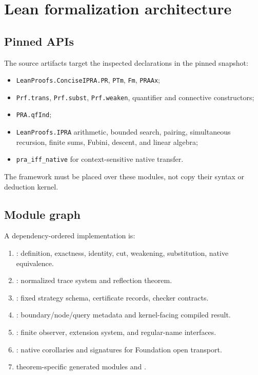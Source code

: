 \section{Lean formalization architecture}\label{sec:lean}

\subsection{Pinned APIs}

The source artifacts target the inspected declarations in the pinned snapshot:
\begin{itemize}
  \item \texttt{LeanProofs.ConciseIPRA.PR}, \texttt{PTm}, \texttt{Fm}, \texttt{PRAAx};
  \item \texttt{Prf.trans}, \texttt{Prf.subst}, \texttt{Prf.weaken}, quantifier and connective constructors;
  \item \texttt{PRA.qfInd};
  \item \texttt{LeanProofs.IPRA} arithmetic, bounded search, pairing, simultaneous recursion, finite sums, Fubini, descent, and linear algebra;
  \item \texttt{pra\_iff\_native} for context-sensitive native transfer.
\end{itemize}
The framework must be placed over these modules, not copy their syntax or deduction kernel.

\subsection{Module graph}

A dependency-ordered implementation is:
\begin{enumerate}[label=\textbf{M\arabic*.},leftmargin=4.2em]
  \item {}: definition, exactness, identity, cut, weakening, substitution, native equivalence.
  \item {}: normalized trace system and reflection theorem.
  \item {}: fixed strategy schema, certificate records, checker contracts.
  \item {}: boundary/node/query metadata and kernel-facing compiled result.
  \item {}: finite observer, extension system, and regular-name interfaces.
  \item {}: native corollaries and signatures for Foundation open transport.
  \item theorem-specific generated modules and .
\end{enumerate}


